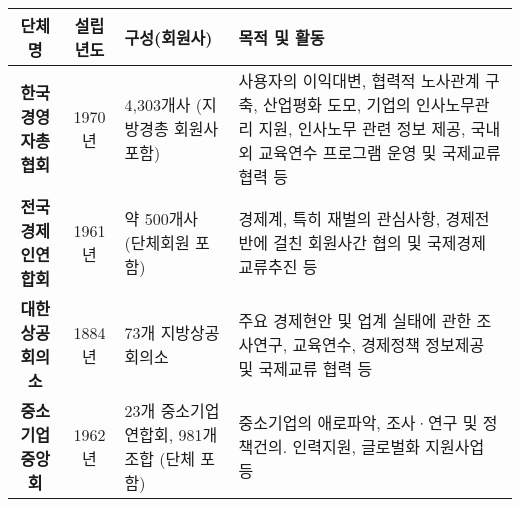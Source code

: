 \begin{tabular}{c|c|p{4cm}|p{7cm}}
\toprule
\textbf{단체명} & \textbf{설립년도} & \textbf{구성(회원사)} & \textbf{목적 및 활동} \\ \midrule
\textbf{한국경영자총협회} & 1970년 & 4,303개사 \newline (지방경총 회원사 포함) & 사용자의 이익대변, 협력적 노사관계 구축, 산업평화 도모, 기업의 인사노무관리 지원, 인사노무 관련 정보 제공, 국내외 교육연수 프로그램 운영 및 국제교류 협력 등 \\ \hline
\textbf{전국경제인연합회} & 1961년 & 약 500개사 (단체회원 포함) & 경제계, 특히 재벌의 관심사항, 경제전반에 걸친 회원사간 협의 및 국제경제 교류추진 등 \\ \hline
\textbf{대한상공회의소} & 1884년 & 73개 지방상공회의소 & 주요 경제현안 및 업계 실태에 관한 조사연구, 교육연수, 경제정책 정보제공 및 국제교류 협력 등 \\ \hline
\textbf{중소기업중앙회} & 1962년 & 23개 중소기업연합회, \newline  981개 조합 (단체 포함) & 중소기업의 애로파악, 조사·연구 및 정책건의. 인력지원, 글로벌화 지원사업 등 \\ \bottomrule
\end{tabular}

